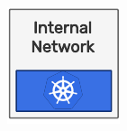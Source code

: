 \begin{figure}
  \centering
  \includegraphics[width=\linewidth]{images/architecture/internal_network.pdf}
\end{figure}

